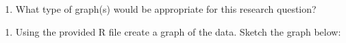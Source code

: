 \documentclass[
]{report}
\providecommand{\tightlist}{%
  \setlength{\itemsep}{0pt}\setlength{\parskip}{0pt}}
\begin{document}
\vspace{0.5in}

\begin{enumerate}
\def\labelenumi{\alph{enumi}.}
\setcounter{enumi}{5}
\tightlist
\item
  What type of graph(s) would be appropriate for this research question?
\end{enumerate}

\vspace{0.3in}

\begin{enumerate}
\def\labelenumi{\alph{enumi}.}
\setcounter{enumi}{6}
\tightlist
\item
  Using the provided R file create a graph of the data. Sketch the graph below:
\end{enumerate}

\vspace{2in}
\end{document}
